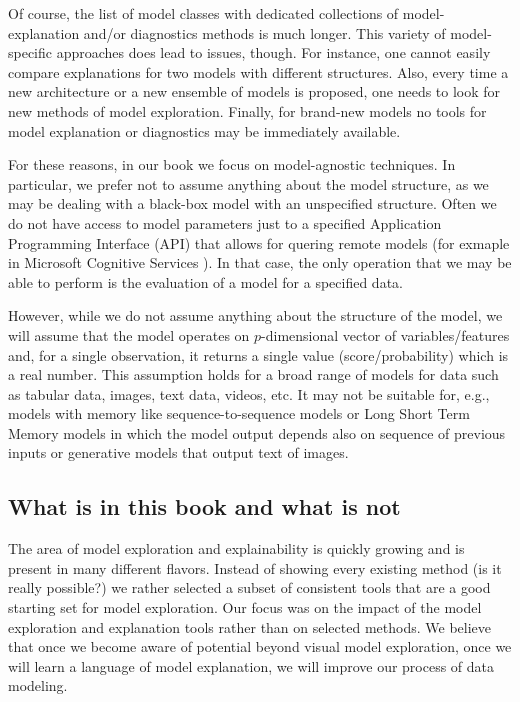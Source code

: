 \documentclass[12pt,]{krantz}
\begin{document}
Of course, the list of model classes with dedicated collections of model-explanation and/or diagnostics methods is much longer. This variety of model-specific approaches does lead to issues, though. For instance, one cannot easily compare explanations for two models with different structures. Also, every time a new architecture or a new ensemble of models is proposed, one needs to look for new methods of model exploration. Finally, for brand-new models no tools for model explanation or diagnostics may be immediately available.

For these reasons, in our book we focus on model-agnostic techniques. In particular, we prefer not to assume anything about the model structure, as we may be dealing with a black-box model with an unspecified structure. Often we do not have access to model parameters just to a specified Application Programming Interface (API) that allows for quering remote models (for exmaple in Microsoft Cognitive Services \citep{MicrosofrCognitiveServices}).
In that case, the only operation that we may be able to perform is the evaluation of a model for a specified data.

However, while we do not assume anything about the structure of the model, we will assume that the model operates on \(p\)-dimensional vector of variables/features and, for a single observation, it returns a single value (score/probability) which is a real number. This assumption holds for a broad range of models for data such as tabular data, images, text data, videos, etc. It may not be suitable for, e.g., models with memory like sequence-to-sequence models \citep{seq2seq} or Long Short Term Memory models \citep{lstm} in which the model output depends also on sequence of previous inputs or generative models that output text of images.

\hypertarget{what-is-in-this-book-and-what-is-not}{%
\subsection{What is in this book and what is not}\label{what-is-in-this-book-and-what-is-not}}

The area of model exploration and explainability is quickly growing and is present in many different flavors. Instead of showing every existing method (is it really possible?) we rather selected a subset of consistent tools that are a good starting set for model exploration. Our focus was on the impact of the model exploration and explanation tools rather than on selected methods. We believe that once we become aware of potential beyond visual model exploration, once we will learn a language of model explanation, we will improve our process of data modeling.
\end{document}
